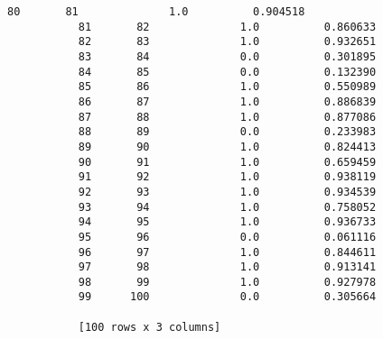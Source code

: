 \documentclass{article}
\begin{document}
\begin{Verbatim}[commandchars=\\\{\}]
           80       81              1.0          0.904518
           81       82              1.0          0.860633
           82       83              1.0          0.932651
           83       84              0.0          0.301895
           84       85              0.0          0.132390
           85       86              1.0          0.550989
           86       87              1.0          0.886839
           87       88              1.0          0.877086
           88       89              0.0          0.233983
           89       90              1.0          0.824413
           90       91              1.0          0.659459
           91       92              1.0          0.938119
           92       93              1.0          0.934539
           93       94              1.0          0.758052
           94       95              1.0          0.936733
           95       96              0.0          0.061116
           96       97              1.0          0.844611
           97       98              1.0          0.913141
           98       99              1.0          0.927978
           99      100              0.0          0.305664
           
           [100 rows x 3 columns]
\end{Verbatim}
        

    
    
    
    
\end{document}
